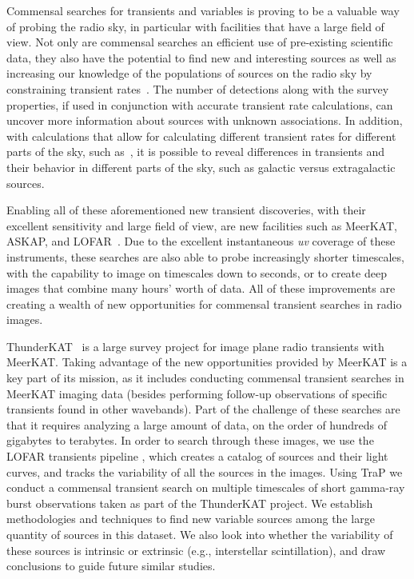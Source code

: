 \documentclass[12pt]{article}
\begin{document}
Commensal searches for transients and variables is proving to be a valuable way of probing the radio sky, in particular with facilities that have a large field of view. Not only are commensal searches an efficient use of pre-existing scientific data, they also have the potential to find new and interesting sources as well as increasing our knowledge of the populations of sources on the radio sky by constraining transient rates~\citep[e.g.,][]{2011ApJ...728L..14B,2016MNRAS.459.3161C}. The number of detections along with the survey properties, if used in conjunction with accurate transient rate calculations, can uncover more information about sources with unknown associations. In addition, with calculations that allow for calculating different transient rates for different parts of the sky, such as~\citep{2022ascl.soft04007C}, it is possible to reveal differences in transients and their behavior in different parts of the sky, such as galactic versus extragalactic sources. 

Enabling all of these aforementioned new transient discoveries, with their excellent sensitivity and large field of view, are new facilities such as MeerKAT, ASKAP, and LOFAR~\citep{2009IEEEP..97.1522J,2008ExA....22..151J,2013A&A...556A...2V}. Due to the excellent instantaneous {\it uv} coverage of these instruments, these searches are also able to probe increasingly shorter timescales, with the capability to image on timescales down to seconds, or to create deep images that combine many hours' worth of data. All of these improvements are creating a wealth of new opportunities for commensal transient searches in radio images. 

ThunderKAT~\citep{2016mks..confE..13F} is a large survey project for image plane radio transients with MeerKAT. Taking advantage of the new opportunities provided by MeerKAT is a key part of its mission, as it includes conducting commensal transient searches in MeerKAT imaging data (besides performing follow-up observations of specific transients found in other wavebands). Part of the challenge of these searches are that it requires analyzing a large amount of data, on the order of hundreds of gigabytes to terabytes. In order to search through these images, we use the LOFAR transients pipeline \citep[{\sc TraP};][]{2015A&C....11...25S}, which creates a catalog of sources and their light curves, and tracks the variability of all the sources in the images. Using TraP we conduct a commensal transient search on multiple timescales of short gamma-ray burst observations taken as part of the ThunderKAT project. We establish methodologies and techniques to find new variable sources among the large quantity of sources in this dataset. We also look into whether the variability of these sources is intrinsic or extrinsic (e.g., interstellar scintillation), and draw conclusions to guide future similar studies. 
\end{document}

